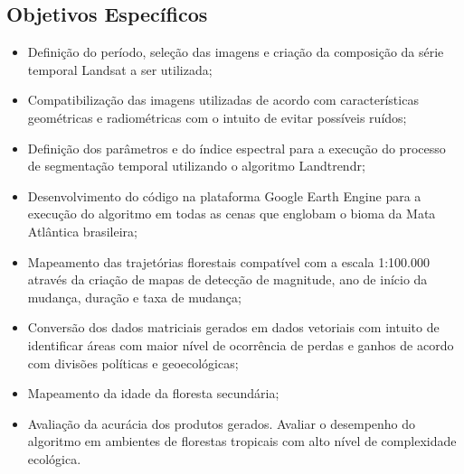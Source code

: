\subsection{Objetivos Específicos}
\begin{itemize}
    \item Definição do período, seleção das imagens e criação da composição da série temporal Landsat a ser utilizada;
    
    \item Compatibilização das imagens utilizadas de acordo com características geométricas e radiométricas com o intuito de evitar possíveis ruídos;
    
    \item Definição dos parâmetros e do índice espectral para a execução do processo de segmentação temporal utilizando o algoritmo Landtrendr;
    
    \item Desenvolvimento do código na plataforma Google Earth Engine para a execução do algoritmo em todas as cenas que englobam o bioma da Mata Atlântica brasileira;
    
    \item Mapeamento das trajetórias florestais compatível com a escala 1:100.000 através da criação de mapas de detecção de magnitude, ano de início da mudança, duração e taxa de mudança;
    
    \item Conversão dos dados matriciais gerados em dados vetoriais com intuito de identificar áreas com maior nível de ocorrência de perdas e ganhos de acordo com divisões políticas e geoecológicas;
    
    \item Mapeamento da idade da floresta secundária;
    
    \item Avaliação da acurácia dos produtos gerados. Avaliar o desempenho do algoritmo em ambientes de florestas tropicais com alto nível de complexidade ecológica.
\end{itemize}